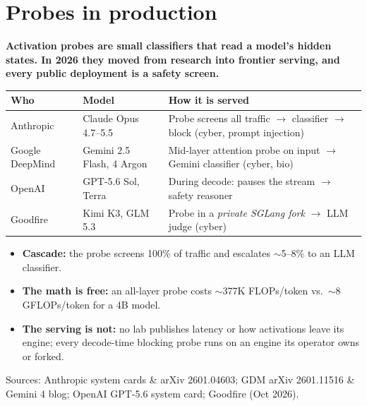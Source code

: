 \section*{Probes in production}

\textbf{Activation probes are small classifiers that read a model's hidden states. In 2026 they moved from research into frontier serving, and every public deployment is a safety screen.}

\vspace{0.5em}
\noindent
\begin{tabularx}{\linewidth}{@{}l l X@{}}
\toprule
\textbf{Who} & \textbf{Model} & \textbf{How it is served} \\
\midrule
Anthropic       & Claude Opus 4.7--5.5   & Probe screens all traffic $\rightarrow$ classifier $\rightarrow$ block (cyber, prompt injection) \\
Google DeepMind & Gemini 2.5 Flash, 4 Argon & Mid-layer attention probe on input $\rightarrow$ Gemini classifier (cyber, bio) \\
OpenAI          & GPT-5.6 Sol, Terra     & During decode: pauses the stream $\rightarrow$ safety reasoner \\
Goodfire        & Kimi K3, GLM 5.3       & Probe in a \emph{private SGLang fork} $\rightarrow$ LLM judge (cyber) \\
\bottomrule
\end{tabularx}

\vspace{0.5em}
\begin{itemize}
  \item \textbf{Cascade:} the probe screens 100\% of traffic and escalates ${\sim}$5--8\% to an LLM classifier.
  \item \textbf{The math is free:} an all-layer probe costs ${\sim}$377K FLOPs/token vs.\ ${\sim}$8 GFLOPs/token for a 4B model.
  \item \textbf{The serving is not:} no lab publishes latency or how activations leave its engine; every decode-time blocking probe runs on an engine its operator owns or forked.
\end{itemize}

{\footnotesize Sources: Anthropic system cards \& arXiv 2601.04603; GDM arXiv 2601.11516 \& Gemini 4 blog; OpenAI GPT-5.6 system card; Goodfire (Oct 2026).}
